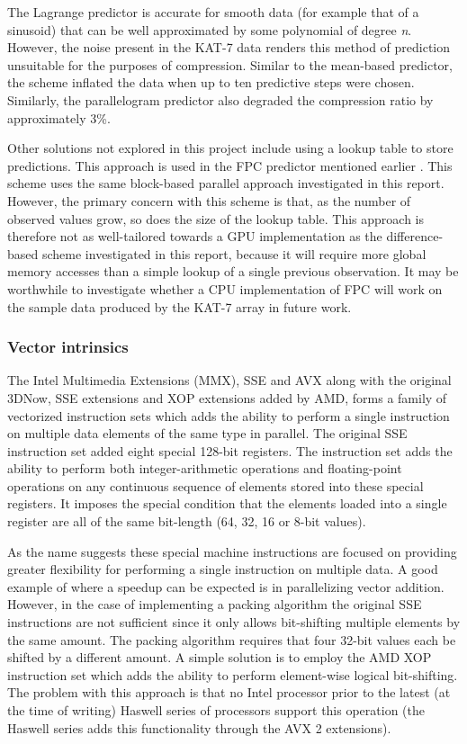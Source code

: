   The Lagrange predictor is accurate for smooth data (for example that of a sinusoid) that can be well approximated by some polynomial of degree \textit{n}. However, the noise present in the KAT-7 data renders this
  method of prediction unsuitable for the purposes of compression. Similar to the mean-based predictor, the scheme inflated the data when up to ten predictive steps were chosen. Similarly, the parallelogram predictor 
  also degraded the compression ratio by approximately 3\%.
  
  Other solutions not explored in this project include using a lookup table to store predictions. This approach is used in the FPC predictor mentioned earlier \cite{4589203,4976448}.
  This scheme uses the same block-based parallel approach investigated in this report. However, the primary concern with this 
  scheme is that, as the number of observed values grow, so does the size of the lookup table. This approach is therefore not as well-tailored towards a GPU implementation as the difference-based scheme investigated 
  in this report, because it will require more global memory accesses than a simple lookup of a single previous observation. It may be worthwhile to investigate whether a CPU implementation of FPC will work on the sample 
  data produced by the KAT-7 array in future work.
  \subsubsection{Vector intrinsics}
  The Intel Multimedia Extensions (MMX), SSE and AVX along with the original 3DNow, SSE extensions and XOP extensions added by AMD, forms a family of vectorized instruction sets which adds the ability to 
  perform a single instruction on multiple data elements of the same type in parallel. The original SSE instruction set added eight special 128-bit registers. The instruction set adds 
  the ability to perform both integer-arithmetic operations and floating-point operations on any continuous sequence of elements stored into these special registers. It imposes the special condition that the 
  elements loaded into a single register are all of the same bit-length (64, 32, 16 or 8-bit values).
  
  As the name suggests these special machine instructions are focused on providing greater flexibility for performing a single instruction on multiple data. A good example of where
  a speedup can be expected is in parallelizing vector addition. However, in the case of implementing a packing algorithm the original SSE instructions are not sufficient since it only allows 
  bit-shifting multiple elements by the same amount. The packing algorithm requires that four 32-bit values each be shifted by a different amount. A simple solution is to employ the AMD XOP 
  instruction set which adds the ability to perform element-wise logical bit-shifting. The problem with this approach is that no Intel processor prior to the latest (at the time of writing) 
  Haswell series of processors support this operation (the Haswell series adds this functionality through the AVX 2 extensions).
  

